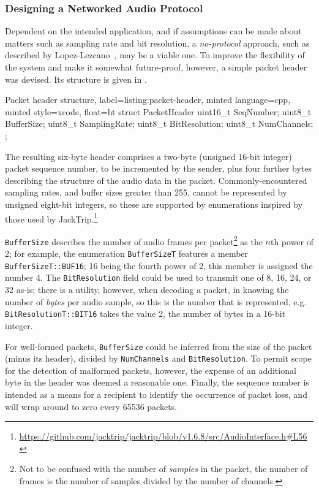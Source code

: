 \subsubsection{Designing a Networked Audio Protocol}\label{subsubsec:designing-a-protocol}

Dependent on the intended application, and if assumptions can be made about
matters such as sampling rate and bit resolution, a \textit{no-protocol}
approach, such as described by Lopez-Lezcano~\citep{lopez-lezcano_jack_2012},
may be a viable one.
To improve the flexibility of the system and make it somewhat future-proof,
however, a simple packet header was devised.
Its structure is given in .

\begin{codelisting}{
    Packet header structure,
    label=listing:packet-header,
    minted language=cpp,
    minted style=xcode,
    float=ht
}
    struct PacketHeader {
        uint16_t SeqNumber;
        uint8_t BufferSize;
        uint8_t SamplingRate;
        uint8_t BitResolution;
        uint8_t NumChannels;
    };
\end{codelisting}

The resulting six-byte header comprises a two-byte (unsigned 16-bit integer)
packet sequence number, to be incremented by the sender, plus four further bytes
describing the structure of the audio data in the packet.
Commonly-encountered sampling rates, and buffer sizes greater than 255, cannot
be represented by unsigned eight-bit integers, so these are supported by
enumerations inspired by those used by JackTrip.\footnote{
    \url{https://github.com/jacktrip/jacktrip/blob/v1.6.8/src/AudioInterface.h\#L56}
}

\texttt{BufferSize} describes the number of audio frames per packet\footnote{
    Not to be confused with the number of \textit{samples} in the packet, the
    number of frames is the number of samples divided by the number of channels.
} as the $n$th power of 2; for example, the enumeration \texttt{BufferSizeT}
features a member \texttt{BufferSizeT::BUF16}; 16 being the fourth power of 2,
this member is assigned the number 4.
The \texttt{BitResolution} field could be used to transmit one of 8, 16, 24, or
32 as-is; there is a utility, however, when decoding a packet, in knowing the
number of \textit{bytes} per audio sample, so this is the number that is
represented, e.g. \texttt{BitResolutionT::BIT16} takes the value 2, the number
of bytes in a 16-bit integer.

For well-formed packets, \texttt{BufferSize} could be inferred from the size of
the packet (minus its header), divided by \texttt{NumChannels} and
\texttt{BitResolution}.
To permit scope for the detection of malformed packets, however, the expense
of an additional byte in the header was deemed a reasonable one.
Finally, the sequence number is intended as a means for a recipient to identify
the occurrence of packet loss, and will wrap around to zero every \num{65536}
packets.


